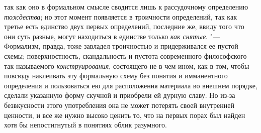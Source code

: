 {{так как оно в формальном смысле сводится лишь к рассудочному
определению {\em тождества};
но этот момент появляется в троичности определений, так как
третье есть единство двух первых определений, последние же, ввиду того что
они суть разные, могут находиться в единстве только
{\em как снятые}. "---
Формализм, правда, тоже завладел троичностью и
придерживался ее пустой схемы; поверхностность, скандальность и пустота
современного философского так называемого {\em конструирования},
состоящего не в чем ином, как в том, чтобы повсюду наклеивать
эту формальную схему без понятия и имманентного определения и пользоваться
ею для расположения материала во внешнем порядке, сделали указанную форму
скучной и приобрели ей дурную
славу.
Но из-за безвкусности этого употребления она не может
потерять своей внутренней ценности, и все же нужно высоко ценить то, что на
первых порах был найден хотя бы непостигнутый в понятиях облик разумного.

}}
